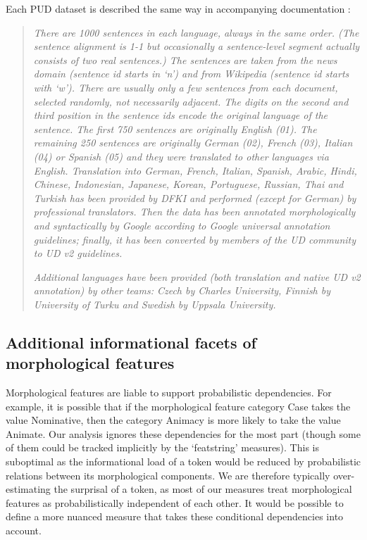 \documentclass[USenglish]{article}
\begin{document}
Each PUD dataset is described the same way in accompanying documentation \citep{UD_2.14}:
\begin{quote}
    
\textit{
There are 1000 sentences in each language, always in the same order. (The sentence alignment is 1-1 but occasionally a sentence-level segment actually consists of two real sentences.) The sentences are taken from the news domain (sentence id starts in ‘n’) and from Wikipedia (sentence id starts with ‘w’). There are usually only a few sentences from each document, selected randomly, not necessarily adjacent. The digits on the second and third position in the sentence ids encode the original language of the sentence. The first 750 sentences are originally English (01). The remaining 250 sentences are originally German (02), French (03), Italian (04) or Spanish (05) and they were translated to other languages via English. Translation into German, French, Italian, Spanish, Arabic, Hindi, Chinese, Indonesian, Japanese, Korean, Portuguese, Russian, Thai and Turkish has been provided by DFKI and performed (except for German) by professional translators. Then the data has been annotated morphologically and syntactically by Google according to Google universal annotation guidelines; finally, it has been converted by members of the UD community to UD v2 guidelines.}

\textit{
Additional languages have been provided (both translation and native UD v2 annotation) by other teams: Czech by Charles University, Finnish by University of Turku and Swedish by Uppsala University.}

\end{quote}


\subsection{Additional informational facets of morphological features}
\label{caveat_conditional_order}
Morphological features are liable to support probabilistic dependencies.
For example, it is possible that if the morphological feature category Case takes the value Nominative, then the category Animacy is more likely to take the value Animate.
Our analysis ignores these dependencies for the most part (though some of them could be tracked implicitly by the `featstring' measures).
This is suboptimal as the informational load of a token would be reduced by probabilistic relations between its morphological components.
We are therefore typically over-estimating the surprisal of a token, as most of our measures treat morphological features as probabilistically independent of each other.
It would be possible to define a more nuanced measure that takes these conditional dependencies into account.
\end{document}
